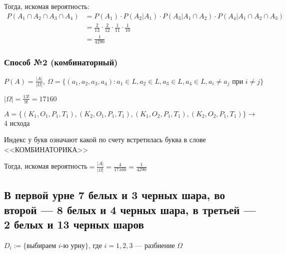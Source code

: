 \documentclass{article}
\begin{document}
Тогда, искомая вероятность:
\begin{equation*}
\begin{aligned}
    P(A_1\cap A_2\cap A_3\cap A_4)&=P(A_1)\cdot P(A_2|A_1)\cdot P(A_3|A_1\cap A_2)\cdot P(A_4|A_1\cap A_2\cap A_3)\\
    &=\frac{2}{13}\cdot\frac{2}{12}\cdot\frac{1}{11}\cdot\frac{1}{10}\\
    &=\frac{1}{4290}
    \end{aligned}
\end{equation*}

\subsubsection*{Способ №2 (комбинаторный)}
$P(A)=\displaystyle\frac{|A|}{|\Omega|},\ \Omega=\{(a_1,a_2,a_3,a_4):a_1\in L, a_2\in L, a_3\in L, a_4\in L, a_i\ne a_j\text{ при }i\ne j\}$

$|\Omega|=\displaystyle\frac{13!}{9!}=17160$

$A=\{(K_1,O_1,P_1,T_1),(K_2,O_1,P_1,T_1),(K_1,O_2,P_1,T_1),(K_2,O_2,P_1,T_1)\}\longrightarrow$ 4 исхода

Индекс у букв означают какой по счету встретилась буква в слове <<КОМБИНАТОРИКА>>

Тогда, искомая вероятность$=\displaystyle\frac{|A|}{|\Omega|}=\frac{4}{17160}=\frac{1}{4290}$

\subsection{В первой урне 7 белых и 3 черных шара, во второй — 8 белых и 4 черных шара, в третьей — 2 белых и 13 черных шаров}
$D_i:=\{\text{выбираем $i$-ю урну}\}$, где $i=1,2,3$ — разбиение $\Omega$
\end{document}
